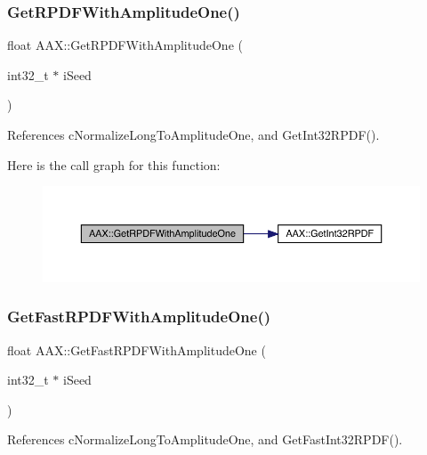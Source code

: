 \subsubsection{\texorpdfstring{GetRPDFWithAmplitudeOne()}{GetRPDFWithAmplitudeOne()}}
{\footnotesize\ttfamily float A\+A\+X\+::\+Get\+R\+P\+D\+F\+With\+Amplitude\+One (\begin{DoxyParamCaption}\item[{int32\+\_\+t $\ast$}]{i\+Seed }\end{DoxyParamCaption})\hspace{0.3cm}{\ttfamily [inline]}}



References c\+Normalize\+Long\+To\+Amplitude\+One, and Get\+Int32\+R\+P\+D\+F().

Here is the call graph for this function\+:
\nopagebreak
\begin{figure}[H]
\begin{center}
\leavevmode
\includegraphics[width=350pt]{a00852_a51d7a263d9053276c6cef1dbd2018ebe_cgraph}
\end{center}
\end{figure}
\mbox{\label{a00852_a145cc6d06cd682e2d234d07ce939760e}} 
\subsubsection{\texorpdfstring{GetFastRPDFWithAmplitudeOne()}{GetFastRPDFWithAmplitudeOne()}}
{\footnotesize\ttfamily float A\+A\+X\+::\+Get\+Fast\+R\+P\+D\+F\+With\+Amplitude\+One (\begin{DoxyParamCaption}\item[{int32\+\_\+t $\ast$}]{i\+Seed }\end{DoxyParamCaption})\hspace{0.3cm}{\ttfamily [inline]}}



References c\+Normalize\+Long\+To\+Amplitude\+One, and Get\+Fast\+Int32\+R\+P\+D\+F().

